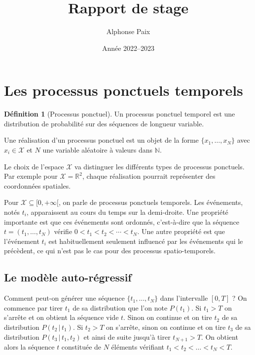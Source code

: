 \documentclass{article}
\author{Alphonse Paix}
\title{Rapport de stage}
\date{Année 2022--2023}
\theoremstyle{definition}
\newtheorem{defn}{Définition}[section]
\theoremstyle{remark}
\begin{document}
\maketitle

\setcounter{tocdepth}{2}
\tableofcontents

\section{Les processus ponctuels temporels}

\begin{defn}[Processus ponctuel]
Un processus ponctuel temporel 
\cite{shchur2020blog, shchur2021neural} est une distribution de probabilité
sur des séquences de longueur variable.

Une réalisation d'un processus ponctuel est un objet de la forme
$\{x_1, \dots, x_N\}$ avec $x_i \in \mathcal{X}$ et $N$ une variable
aléatoire à valeurs dans $\mathbb{N}$.
\end{defn}

Le choix de l'espace $\mathcal{X}$ va distinguer les différents types
de processus ponctuels. Par exemple pour $\mathcal{X} = \mathbb{R}^2$,
chaque réalisation pourrait représenter des coordonnées spatiales.

Pour $\mathcal{X} \subseteq [0, +\infty[$, on parle de processus
ponctuels temporels. Les événements, notés $t_i$, apparaissent au cours
du temps sur la demi-droite. Une propriété importante est que ces événements
sont ordonnés, c'est-à-dire que la séquence $t = (t_1, \dots, t_N)$
vérifie $0 < t_1 < t_2 < \cdots < t_N$. Une autre propriété est que
l'événement $t_i$ est habituellement seulement influencé par les événements
qui le précèdent, ce qui n'est pas le cas pour des processus spatio-temporels.

\subsection{Le modèle auto-régressif}

Comment peut-on générer une séquence $\{t_1, \dots, t_N\}$ dans l'intervalle
$[0, T]$ ? On commence par tirer $t_1$ de sa distribution que l'on note
$P(t_1)$. Si $t_1 > T$ on s'arrête et on obtient la séquence vide $t$.
Sinon on continue et on tire $t_2$ de sa distribution $P(t_2\, |\, t_1)$.
Si $t_2 > T$ on s'arrête, sinon on continue et on tire $t_3$
de sa distribution $P(t_3 \, |\,  t_1, t_2)$ et ainsi de suite
jusqu'à tirer $t_{N+1} > T$. On obtient alors la séquence $t$ constituée de
$N$ éléments vérifiant $t_1 < t_2 < \dots < t_N < T$.
\end{document}
